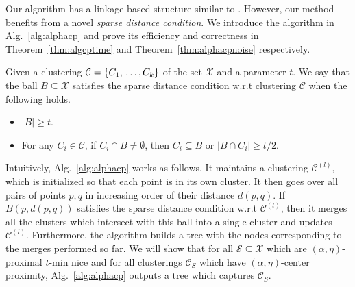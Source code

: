 \documentclass[orivec]{llncs}
\newcommand{\mc}{\mathcal}
\begin{document}
Our algorithm has a linkage based structure similar to \cite{balcan2012clustering}. However, our method benefits from a novel {\it sparse distance condition}. We introduce the algorithm in Alg.~\ref{alg:alphacp} and prove its efficiency and correctness in Theorem~\ref{thm:algcptime} and Theorem~\ref{thm:alphacpnoise} respectively. 

\begin{definition}
	 Given a clustering $\mc C = \{C_1,\\\ldots,C_k\}$ of the set $\mc X$ and a parameter $t$. We say that the ball $B \subseteq \mc X$ satisfies the sparse distance condition w.r.t clustering $\mc C$ when the following holds.
\begin{itemize}[noitemsep,nolistsep,leftmargin=*]
\item $|B| \ge t$.
\item For any $C_i \in \mc C$, if $C_i \cap B \neq \emptyset$, then $C_i \subseteq B$ or $|B \cap C_i| \ge t/2$.
\end{itemize}
\end{definition}

Intuitively, Alg.~\ref{alg:alphacp} works as follows. It maintains a clustering $\mc C^{(l)}$, which is initialized so that each point is in its own cluster. It then goes over all pairs of points $p, q$ in increasing order of their distance $d(p, q)$. If $B(p, d(p,q))$ satisfies the sparse distance condition w.r.t $\mc C^{(l)}$, then it merges all the clusters which intersect with this ball into a single cluster and updates $\mc C^{(l)}$. Furthermore, the algorithm builds a tree with the nodes corresponding to the merges performed so far. We will show that for all $\mc S \subseteq \mc X$ which are $(\alpha, \eta)$-proximal $t$-min nice and for all clusterings $\mc C_S$ which have $(\alpha, \eta)$-center proximity, Alg.~\ref{alg:alphacp} outputs a tree which captures $\mc C_S$.
\end{document}
